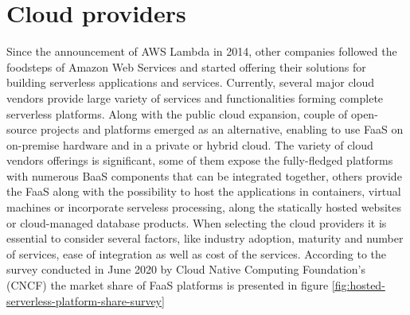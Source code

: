 \section{Cloud providers} \label{chapter:serverless-service-providers}

Since the announcement of AWS Lambda in 2014, other companies followed the foodsteps of Amazon Web Services and started offering their solutions for building serverless applications and services. Currently, several major cloud vendors provide large variety of services and functionalities forming complete serverless platforms. Along with the public cloud expansion, couple of open-source projects and platforms emerged as an alternative, enabling to use FaaS on on-premise hardware and in a private or hybrid cloud. The variety of cloud vendors offerings is significant, some of them expose the fully-fledged platforms with numerous BaaS components that can be integrated together, others provide the FaaS along with the possibility to host the applications in containers, virtual machines or incorporate serveless processing, along the statically hosted websites or cloud-managed database products. When selecting the cloud providers it is essential to consider several factors, like industry adoption, maturity and number of services, ease of integration as well as cost of the services. According to the survey conducted in June 2020 by Cloud Native Computing Foundation's (CNCF) \cite{CNCFServerlessSurvey2020} the market share of FaaS platforms is presented in figure \ref{fig:hosted-serverless-platform-share-survey}



